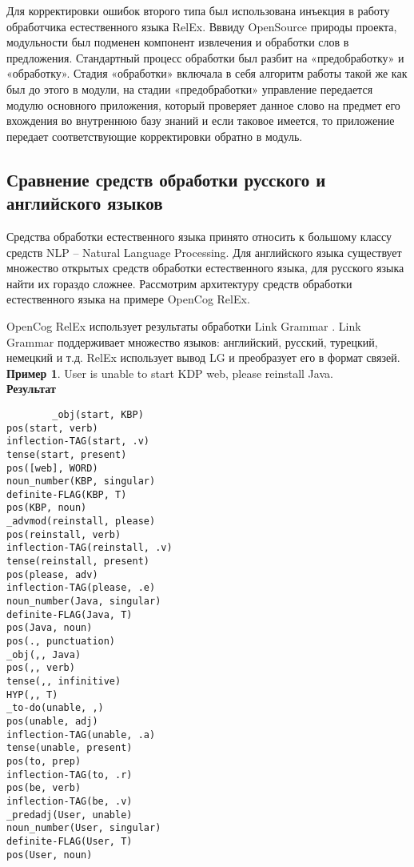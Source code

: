 Для корректировки ошибок второго типа был использована инъекция в работу обработчика естественного языка RelEx. Вввиду OpenSource природы проекта, модульности был подменен компонент извлечения и обработки слов в предложения. Стандартный процесс обработки был разбит на «предобработку» и «обработку». Стадия «обработки» включала в себя алгоритм работы такой же как был до этого в модули, на стадии «предобработки» управление передается модулю основного приложения, который проверяет данное слово на предмет его вхождения во внутреннюю базу знаний и если таковое имеется, то приложение передает соответствующие корректировки обратно в модуль.

\clearpage
\subsection{Сравнение средств обработки русского и английского языков} \label{sect2_3}
Средства обработки естественного языка принято относить к большому классу средств NLP – Natural Language Processing. Для английского языка существует множество открытых средств обработки естественного языка, для русского языка найти их гораздо сложнее. Рассмотрим архитектуру средств обработки естественного языка на примере OpenCog RelEx. \par
OpenCog RelEx использует результаты обработки Link Grammar \cite{linkgrammar}. Link Grammar поддерживает множество языков: английский, русский, турецкий, немецкий и т.д.  RelEx использует вывод LG и преобразует его в формат связей.
\textbf{Пример 1}. User is unable to start KDP web, please reinstall Java.\\
\textbf{Результат} 
\begin{verbatim}
		_obj(start, KBP)
pos(start, verb)
inflection-TAG(start, .v)
tense(start, present)
pos([web], WORD)
noun_number(KBP, singular)
definite-FLAG(KBP, T)
pos(KBP, noun)
_advmod(reinstall, please)
pos(reinstall, verb)
inflection-TAG(reinstall, .v)
tense(reinstall, present)
pos(please, adv)
inflection-TAG(please, .e)
noun_number(Java, singular)
definite-FLAG(Java, T)
pos(Java, noun)
pos(., punctuation)
_obj(,, Java)
pos(,, verb)
tense(,, infinitive)
HYP(,, T)
_to-do(unable, ,)
pos(unable, adj)
inflection-TAG(unable, .a)
tense(unable, present)
pos(to, prep)
inflection-TAG(to, .r)
pos(be, verb)
inflection-TAG(be, .v)
_predadj(User, unable)
noun_number(User, singular)
definite-FLAG(User, T)
pos(User, noun)

\end{verbatim}



